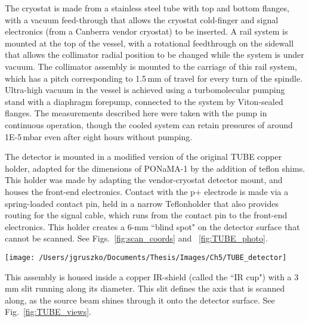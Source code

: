 The cryostat is made from a stainless steel tube with top and bottom flanges, with a vacuum feed-through that allows the cryostat cold-finger and signal electronics (from a Canberra vendor cryostat) to be inserted. A rail system is mounted at the top of the vessel, with a rotational feedthrough on the sidewall that allows the collimator radial position to be changed while the system is under vacuum. The collimator assembly is mounted to the carriage of this rail system, which has a pitch corresponding to 1.5\,mm of travel for every turn of the spindle. Ultra-high vacuum in the vessel is achieved using a turbomolecular pumping stand with a diaphragm forepump, connected to the system by Viton-sealed flanges. The measurements described here were taken with the pump in continuous operation, though the cooled system can retain pressures of around 1E-5\,mbar even after eight hours without pumping. 

The detector is mounted in a modified version of the original TUBE copper holder, adapted for the dimensions of PONaMA-1 by the addition of teflon shims. This holder was made by adapting the vendor-cryostat detector mount, and houses the front-end electronics. Contact with the p+ electrode is made via a spring-loaded contact pin, held in a narrow Teflon\textsuperscript\textregistered holder that also provides routing for the signal cable, which runs from the contact pin to the front-end electronics. This holder creates a 6-mm ``blind spot" on the detector surface that cannot be scanned. See Figs.~\ref{fig:scan_coords} and ~\ref{fig:TUBE_photo}. 

\begin{SCfigure}
\centering
 \texttt{[image: /Users/jgruszko/Documents/Thesis/Images/Ch5/TUBE\_detector]}
 \caption[A photo of PONaMa-1 installed in the TUBE detector cup]{A photo of PONaMa-1 installed in the TUBE detector cup. The contact pin, visible at the center of the detector, is held by the Teflon\textsuperscript\textregistered\ crossbar, with the signal cable running along the top.} 
 \label{fig:TUBE_photo}
\end{SCfigure}

This assembly is housed inside a copper IR-shield (called the ``IR cup") with a 3\,mm slit running along its diameter. This slit defines the axis that is scanned along, as the source beam shines through it onto the detector surface. See Fig.~\ref{fig:TUBE_views}. 

